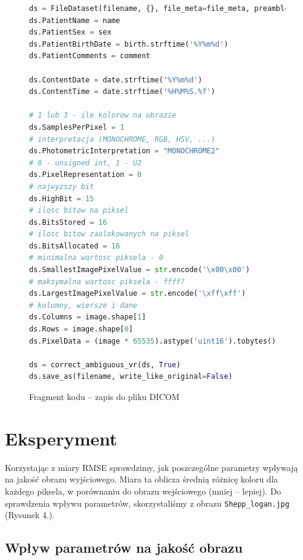 \documentclass[polish,polish,a4paper]{article}
\begin{document}
			\begin{figure}[!h]
				\centering
				\begin{lstlisting}[language=Python, frame=single]
ds = FileDataset(filename, {}, file_meta=file_meta, preamble=b"\0" * 128)
ds.PatientName = name
ds.PatientSex = sex
ds.PatientBirthDate = birth.strftime('%Y%m%d')
ds.PatientComments = comment

ds.ContentDate = date.strftime('%Y%m%d')
ds.ContentTime = date.strftime('%H%M%S.%f')

# 1 lub 3 - ile kolorow na obrazie
ds.SamplesPerPixel = 1
# interpretacja (MONOCHROME, RGB, HSV, ...)
ds.PhotometricInterpretation = "MONOCHROME2"
# 0 - unsigned int, 1 - U2
ds.PixelRepresentation = 0
# najwyzszy bit
ds.HighBit = 15
# ilosc bitow na piksel
ds.BitsStored = 16
# ilosc bitow zaalokowanych na piksel
ds.BitsAllocated = 16
# minimalna wartosc piksela - 0
ds.SmallestImagePixelValue = str.encode('\x00\x00')
# maksymalna wartosc piksela - ffff?
ds.LargestImagePixelValue = str.encode('\xff\xff')
# kolumny, wiersze i dane
ds.Columns = image.shape[1]
ds.Rows = image.shape[0]
ds.PixelData = (image * 65535).astype('uint16').tobytes()

ds = correct_ambiguous_vr(ds, True)
ds.save_as(filename, write_like_original=False)
				\end{lstlisting}
				\caption{Fragment kodu -- zapis do pliku DICOM}
				\label{dicomsave}
			\end{figure}
			
	\section{Eksperyment}
		Korzystając z miary RMSE sprawdzimy, 
		jak poszczególne parametry wpływają na jakość obrazu wyjściowego. 
		Miara ta oblicza średnią różnicę koloru dla każdego piksela, w porównaniu do obrazu wejściowego (mniej -- lepiej). 
		Do sprawdzenia wpływu parametrów, skorzystaliśmy z obrazu \texttt{Shepp\_logan.jpg} (Rysunek 4.).
		
		\newpage
		\subsection{Wpływ parametrów na jakość obrazu}
		
\end{document}
